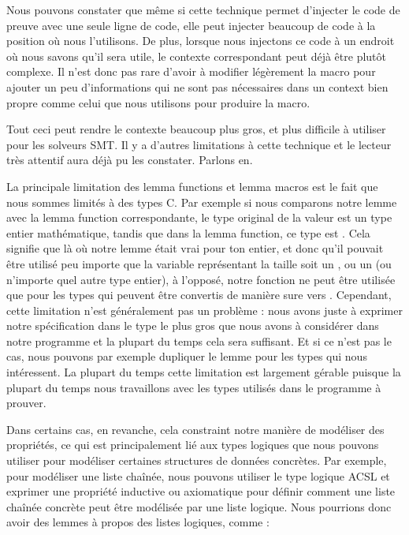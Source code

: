 Nous pouvons constater que même si cette technique permet d'injecter le code de
preuve avec une seule ligne de code, elle peut injecter beaucoup de code à la
position où nous l'utilisons. De plus, lorsque nous injectons ce code à un endroit
où nous savons qu'il sera utile, le contexte correspondant peut déjà être plutôt
complexe. Il n'est donc pas rare d'avoir à modifier légèrement la macro pour
ajouter un peu d'informations qui ne sont pas nécessaires dans un context bien
propre comme celui que nous utilisons pour produire la macro.


Tout ceci peut rendre le contexte beaucoup plus gros, et plus difficile à utiliser
pour les solveurs SMT. Il y a d'autres limitations à cette technique et le lecteur
très attentif aura déjà pu les constater. Parlons en.





La principale limitation des lemma functions et lemma macros est le fait que nous
sommes limités à des types C. Par exemple si nous comparons notre lemme
 avec la lemma function correspondante,
le type original de la valeur  est un type entier mathématique,
tandis que dans la lemma function, ce type est . Cela signifie
que là où notre lemme était vrai pour ton entier, et donc qu'il pouvait être 
utilisé peu importe que la variable représentant la taille soit un ,
ou un  (ou n'importe quel autre type entier), à l'opposé, notre
fonction ne peut être utilisée que pour les types qui peuvent être convertis de
manière sure vers . Cependant, cette limitation n'est
généralement pas un problème : nous avons juste à exprimer notre spécification dans
le type le plus gros que nous avons à considérer dans notre programme et la plupart
du temps cela sera suffisant. Et si ce n'est pas le cas, nous pouvons par exemple
dupliquer le lemme pour les types qui nous intéressent. La plupart du temps cette
limitation est largement gérable puisque la plupart du temps nous travaillons avec
les types utilisés dans le programme à prouver.


Dans certains cas, en revanche, cela constraint notre manière de modéliser des
propriétés, ce qui est principalement lié aux types logiques que nous pouvons
utiliser pour modéliser certaines structures de données concrètes. Par exemple,
pour modéliser une liste chaînée, nous pouvons utiliser le type logique ACSL
 et exprimer une propriété inductive ou
axiomatique pour définir comment une liste chaînée concrète peut être modélisée
par une liste logique. Nous pourrions donc avoir des lemmes à propos des listes
logiques, comme :

